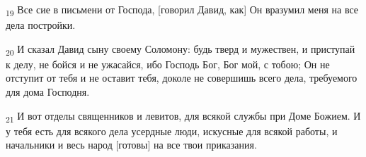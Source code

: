 \begin{tcolorbox}
\textsubscript{19} Все сие в письмени от Господа, [говорил Давид, как] Он вразумил меня на все дела постройки.
\end{tcolorbox}
\begin{tcolorbox}
\textsubscript{20} И сказал Давид сыну своему Соломону: будь тверд и мужествен, и приступай к делу, не бойся и не ужасайся, ибо Господь Бог, Бог мой, с тобою; Он не отступит от тебя и не оставит тебя, доколе не совершишь всего дела, требуемого для дома Господня.
\end{tcolorbox}
\begin{tcolorbox}
\textsubscript{21} И вот отделы священников и левитов, для всякой службы при Доме Божием. И у тебя есть для всякого дела усердные люди, искусные для всякой работы, и начальники и весь народ [готовы] на все твои приказания.
\end{tcolorbox}
